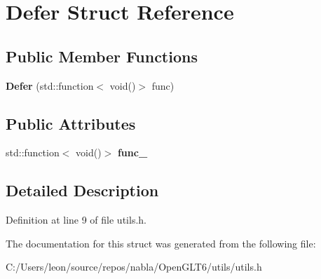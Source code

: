 \hypertarget{struct_defer}{}\section{Defer Struct Reference}
\label{struct_defer}
\subsection*{Public Member Functions}
\begin{DoxyCompactItemize}
\item 
\mbox{\label{struct_defer_aad57b59d1b441c918c2abf3270b87e4c}} 
{\bfseries Defer} (std\+::function$<$ void()$>$ func)
\end{DoxyCompactItemize}
\subsection*{Public Attributes}
\begin{DoxyCompactItemize}
\item 
\mbox{\label{struct_defer_a47a52b61c4f847b4b30df1faae461536}} 
std\+::function$<$ void()$>$ {\bfseries func\+\_\+}
\end{DoxyCompactItemize}


\subsection{Detailed Description}


Definition at line 9 of file utils.\+h.



The documentation for this struct was generated from the following file\+:\begin{DoxyCompactItemize}
\item 
C\+:/\+Users/leon/source/repos/nabla/\+Open\+G\+L\+T6/utils/utils.\+h\end{DoxyCompactItemize}

